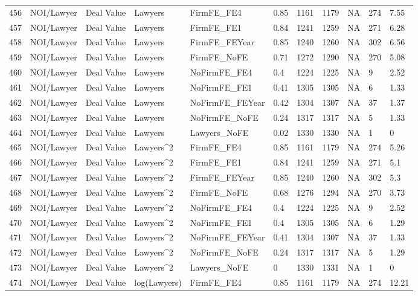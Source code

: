 \documentclass{article}
\begin{document}
\begin{table}[H]
\begin{tabular}{rllllllllll}
  456 & NOI/Lawyer & Deal Value & Lawyers & FirmFE\_FE4 & 0.85 & 1161 & 1179 & NA & 274 & 7.55 \\ 
  457 & NOI/Lawyer & Deal Value & Lawyers & FirmFE\_FE1 & 0.84 & 1241 & 1259 & NA & 271 & 6.28 \\ 
  458 & NOI/Lawyer & Deal Value & Lawyers & FirmFE\_FEYear & 0.85 & 1240 & 1260 & NA & 302 & 6.56 \\ 
  459 & NOI/Lawyer & Deal Value & Lawyers & FirmFE\_NoFE & 0.71 & 1272 & 1290 & NA & 270 & 5.08 \\ 
  460 & NOI/Lawyer & Deal Value & Lawyers & NoFirmFE\_FE4 & 0.4 & 1224 & 1225 & NA & 9 & 2.52 \\ 
  461 & NOI/Lawyer & Deal Value & Lawyers & NoFirmFE\_FE1 & 0.41 & 1305 & 1305 & NA & 6 & 1.33 \\ 
  462 & NOI/Lawyer & Deal Value & Lawyers & NoFirmFE\_FEYear & 0.42 & 1304 & 1307 & NA & 37 & 1.37 \\ 
  463 & NOI/Lawyer & Deal Value & Lawyers & NoFirmFE\_NoFE & 0.24 & 1317 & 1317 & NA & 5 & 1.33 \\ 
  464 & NOI/Lawyer & Deal Value & Lawyers & Lawyers\_NoFE & 0.02 & 1330 & 1330 & NA & 1 & 0 \\ 
  465 & NOI/Lawyer & Deal Value & Lawyers^2 & FirmFE\_FE4 & 0.85 & 1161 & 1179 & NA & 274 & 5.26 \\ 
  466 & NOI/Lawyer & Deal Value & Lawyers^2 & FirmFE\_FE1 & 0.84 & 1241 & 1259 & NA & 271 & 5.1 \\ 
  467 & NOI/Lawyer & Deal Value & Lawyers^2 & FirmFE\_FEYear & 0.85 & 1240 & 1260 & NA & 302 & 5.3 \\ 
  468 & NOI/Lawyer & Deal Value & Lawyers^2 & FirmFE\_NoFE & 0.68 & 1276 & 1294 & NA & 270 & 3.73 \\ 
  469 & NOI/Lawyer & Deal Value & Lawyers^2 & NoFirmFE\_FE4 & 0.4 & 1224 & 1225 & NA & 9 & 2.52 \\ 
  470 & NOI/Lawyer & Deal Value & Lawyers^2 & NoFirmFE\_FE1 & 0.4 & 1305 & 1305 & NA & 6 & 1.29 \\ 
  471 & NOI/Lawyer & Deal Value & Lawyers^2 & NoFirmFE\_FEYear & 0.41 & 1304 & 1307 & NA & 37 & 1.33 \\ 
  472 & NOI/Lawyer & Deal Value & Lawyers^2 & NoFirmFE\_NoFE & 0.24 & 1317 & 1317 & NA & 5 & 1.29 \\ 
  473 & NOI/Lawyer & Deal Value & Lawyers^2 & Lawyers\_NoFE & 0 & 1330 & 1331 & NA & 1 & 0 \\ 
  474 & NOI/Lawyer & Deal Value & log(Lawyers) & FirmFE\_FE4 & 0.85 & 1161 & 1179 & NA & 274 & 12.21 \\ 

\end{tabular}
\end{table}
\end{document}
